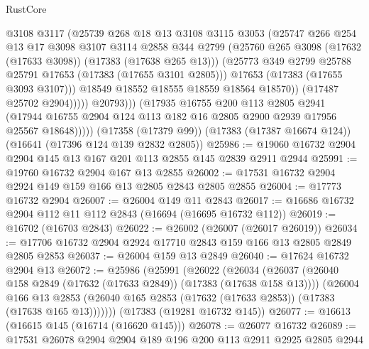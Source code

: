 \begin{lexlean}{RustCore}
\begin{coremodule}
                          @3108
                          @3117
                          (@25739
                            @268
                            @18
                            @13
                            @3108
                            @3115
                            @3053
                            (@25747
                              @266
                              @254
                              @13
                              @17
                              @3098
                              @3107
                              @3114
                              @2858
                              @344
                              @2799
                              (@25760 @265 @3098 (@17632 (@17633 @3098)) (@17383 (@17638 @265 @13)))
                              (@25773 @349 @2799 @25788 @25791 @17653 (@17383 (@17655 @3101 @2805)))
                              @17653
                              (@17383 (@17655 @3093 @3107)))
                            @18549
                            @18552
                            @18555
                            @18559
                            @18564
                            @18570))
                        (@17487 @25702 @2904)))))
                @20793)))
          (@17935
            @16755
            @200
            @113
            @2805
            @2941
            (@17944 @16755 @2904 @124 @113 @182 @16 @2805 @2900 @2939 @17956 @25567 @18648)))))
    (@17358 (@17379 @99))
    (@17383 (@17387 @16674 @124))
    (@16641 (@17396 @124 @139 @2832 @2805))
@25986 := @19060 @16732 @2904 @2904 @145 @13 @167 @201 @113 @2855 @145 @2839 @2911 @2944
@25991 := @19760 @16732 @2904 @167 @13 @2855
@26002 := @17531 @16732 @2904 @2924 @149 @159 @166 @13 @2805 @2843 @2805 @2855
@26004 := @17773 @16732 @2904
@26007 := @26004 @149 @11 @2843
@26017 := @16686 @16732 @2904 @112 @11 @112 @2843 (@16694 (@16695 @16732 @112))
@26019 := @16702 (@16703 @2843)
@26022 := @26002 (@26007 (@26017 @26019))
@26034 := @17706 @16732 @2904 @2924 @17710 @2843 @159 @166 @13 @2805 @2849 @2805 @2853
@26037 := @26004 @159 @13 @2849
@26040 := @17624 @16732 @2904 @13
@26072 := @25986
    (@25991
      (@26022
        (@26034
          (@26037 (@26040 @158 @2849 (@17632 (@17633 @2849)) (@17383 (@17638 @158 @13))))
          (@26004
            @166
            @13
            @2853
            (@26040 @165 @2853 (@17632 (@17633 @2853)) (@17383 (@17638 @165 @13)))))))
    (@17383 (@19281 @16732 @145))
@26077 := @16613 (@16615 @145 (@16714 (@16620 @145)))
@26078 := @26077 @16732
@26089 := @17531 @26078 @2904 @2904 @189 @196 @200 @113 @2911 @2925 @2805 @2944

\end{coremodule}
\end{lexlean}
